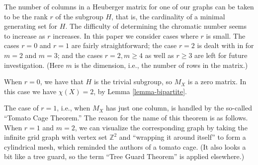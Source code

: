 \documentclass{article}
\theoremstyle{definition}
\theoremstyle{remark}
\begin{document}
\vspace{.1in}

The number of columns in a Heuberger matrix for one of our graphs can be taken to be the rank $r$ of the subgroup $H$, that is, the cardinality of a minimal generating set for $H$.  The difficulty of determining the chromatic number seems to increase as $r$ increases.  In this paper we consider cases where $r$ is small.  The cases $r=0$ and $r=1$ are fairly straightforward; the case $r=2$ is dealt with in \cite{Cervantes-Krebs-small-cases} for $m=2$ and $m=3$; and the cases $r=2, m\geq 4$ as well as $r\geq 3$ are left for future investigation.  (Here $m$ is the dimension, i.e., the number of rows in the matrix.)

When $r=0$, we have that $H$ is the trivial subgroup, so $M_X$ is a zero matrix.  In this case we have $\chi(X)=2$, by Lemma \ref{lemma-bipartite}.

The case of $r=1$, i.e., when $M_X$ has just one column, is handled by the so-called ``Tomato Cage Theorem.''   The reason for the name of this theorem is as follows.  When $r=1$ and $m=2$, we can visualize the corresponding graph by taking the infinite grid graph with vertex set $\mathbb{Z}^2$ and ``wrapping it around itself'' to form a cylindrical mesh, which reminded the authors of a tomato cage.  (It also looks a bit like a tree guard, so the term ``Tree Guard Theorem'' is applied elsewhere.)
\end{document}
